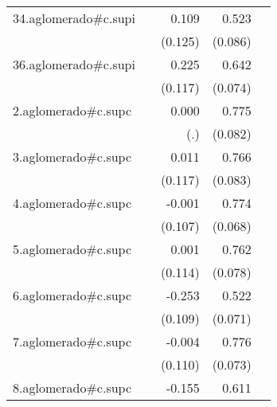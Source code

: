 {\begin{longtable}{l*{4}{D{.}{.}{-1}}}
\addlinespace
34.aglomerado#c.supi&                     &       0.109         &       0.523\sym{***}&                     \\
            &                     &     (0.125)         &     (0.086)         &                     \\
\addlinespace
36.aglomerado#c.supi&                     &       0.225         &       0.642\sym{***}&                     \\
            &                     &     (0.117)         &     (0.074)         &                     \\
\addlinespace
2.aglomerado#c.supc&                     &       0.000         &       0.775\sym{***}&                     \\
            &                     &         (.)         &     (0.082)         &                     \\
\addlinespace
3.aglomerado#c.supc&                     &       0.011         &       0.766\sym{***}&                     \\
            &                     &     (0.117)         &     (0.083)         &                     \\
\addlinespace
4.aglomerado#c.supc&                     &      -0.001         &       0.774\sym{***}&                     \\
            &                     &     (0.107)         &     (0.068)         &                     \\
\addlinespace
5.aglomerado#c.supc&                     &       0.001         &       0.762\sym{***}&                     \\
            &                     &     (0.114)         &     (0.078)         &                     \\
\addlinespace
6.aglomerado#c.supc&                     &      -0.253\sym{*}  &       0.522\sym{***}&                     \\
            &                     &     (0.109)         &     (0.071)         &                     \\
\addlinespace
7.aglomerado#c.supc&                     &      -0.004         &       0.776\sym{***}&                     \\
            &                     &     (0.110)         &     (0.073)         &                     \\
\addlinespace
8.aglomerado#c.supc&                     &      -0.155         &       0.611\sym{***}&                     \\

\end{longtable}}
